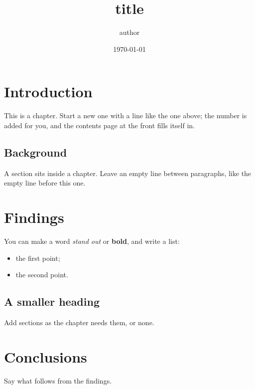 \documentclass[11pt]{report}
\title{{{title}}}
\author{{{author}}}
\date{\today}
\begin{document}
\maketitle
\tableofcontents

\chapter{Introduction}

This is a chapter. Start a new one with a line like the one above; the number is added for you,
and the contents page at the front fills itself in.

\section{Background}

A section sits inside a chapter. Leave an empty line between paragraphs, like the empty line
before this one.

\chapter{Findings}

You can make a word \emph{stand out} or \textbf{bold}, and write a list:

\begin{itemize}
  \item the first point;
  \item the second point.
\end{itemize}

\section{A smaller heading}

Add sections as the chapter needs them, or none.

\chapter{Conclusions}

Say what follows from the findings.
\end{document}
